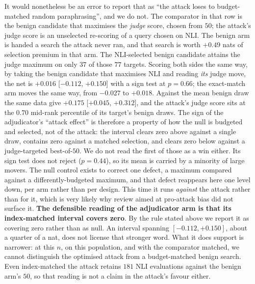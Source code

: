 It would nonetheless be an error to report that as ``the attack loses to budget-matched random
paraphrasing'', and we do not. The comparator in that row is the benign candidate that maximises
the \emph{judge} score, chosen from $50$; the attack's judge score is an unselected re-scoring of
a query chosen on NLI. The benign arm is handed a search the attack never ran, and that search
is worth
$+0.49$ nats of selection premium in that arm. The NLI-selected benign candidate attains the
judge maximum on only $37$ of those $77$ targets. Scoring both sides the same way, by taking the
benign candidate that maximises NLI and reading \emph{its} judge move, the net is
$+0.016$ [$-0.112$, $+0.150$] with a sign test at $p{=}0.66$; the exact-match arm moves the same
way, from $-0.027$ to $+0.018$. Against the mean benign draw the same data give
$+0.175$ [$+0.045$, $+0.312$], and the attack's judge score sits at the $0.70$ mid-rank
percentile of its target's benign draws. The sign of the adjudicator's ``attack effect'' is
therefore a property of how the null is budgeted and selected, not of the attack: the interval
clears zero above against a single draw, contains zero against a matched selection, and clears
zero below against a judge-targeted best-of-$50$. We do not read the first of those as a win
either. Its sign test does not reject ($p{=}0.44$), so its mean is carried by a minority of
large movers. The null control exists to correct one defect, a maximum compared against a
differently-budgeted maximum, and that defect reappears here one level
down, per arm rather than per design. This time it runs \emph{against} the attack rather than
for it, which is very likely why review aimed at pro-attack bias did not surface it. \textbf{The
defensible reading of the adjudicator arm is that its index-matched interval covers zero}. By
the rule stated above we report it as covering zero rather than as null. An interval
spanning $[-0.112, +0.150]$, about a quarter of a nat, does not license that stronger word.
What it does support is narrower: at this $n$, on this
population,
and with the comparator matched, we cannot distinguish the optimised attack from a
budget-matched benign
search. Even index-matched the attack retains $181$ NLI evaluations against the benign arm's
$50$, so that reading is not a claim in the attack's favour either.

